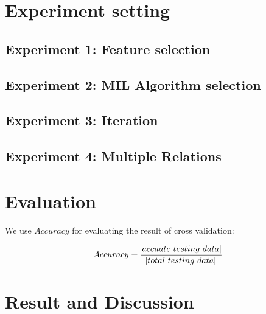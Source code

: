 \section{Experiment setting}

\subsection{Experiment 1: Feature selection}
\subsection{Experiment 2: MIL Algorithm selection}
\subsection{Experiment 3: Iteration}
\subsection{Experiment 4: Multiple Relations}

\section{Evaluation}
We use $Accuracy$ for evaluating the result of cross validation:

\begin{equation}
Accuracy = \frac{\abs{accuate\ testing\ data}}{\abs{total\ testing\ data}}
\label{eq:accuracy}
\end{equation}

\section{Result and Discussion}
